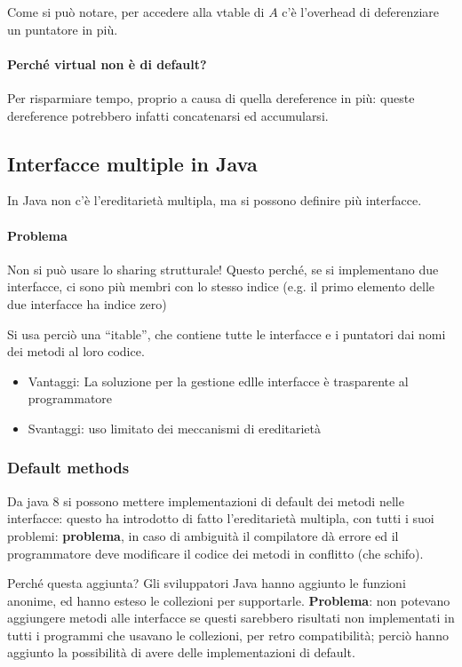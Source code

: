 \documentclass[a4paper,10pt]{article}
\begin{document}
Come si può notare, per accedere alla vtable di $A$ c'è l'overhead di deferenziare un puntatore in più.

\paragraph{Perché virtual non è di default?} Per risparmiare tempo, proprio a causa di quella dereference in più: queste dereference potrebbero infatti concatenarsi ed accumularsi.
\newpage

\subsection{Interfacce multiple in Java}

In Java non c'è l'ereditarietà multipla, ma si possono definire più interfacce. 

\paragraph{Problema} Non si può usare lo sharing strutturale! Questo perché, se si implementano due interfacce, ci sono più membri con lo stesso indice (e.g. il primo elemento delle due interfacce ha indice zero)\smallskip

Si usa perciò una ``itable'', che contiene tutte le interfacce e i puntatori dai nomi dei metodi al loro codice.\smallskip

\begin{itemize}
 \item Vantaggi: La soluzione per la gestione edlle interfacce è trasparente al programmatore 
 \item Svantaggi: uso limitato dei meccanismi di ereditarietà
\end{itemize}

\subsubsection{Default methods}

Da java 8 si possono mettere implementazioni di default dei metodi nelle interfacce: questo ha introdotto di fatto l'ereditarietà multipla, con tutti i suoi problemi: \textbf{problema}, in caso di ambiguità il compilatore dà errore ed il programmatore deve modificare il codice dei metodi in conflitto (che schifo).\smallskip

Perché questa aggiunta? Gli sviluppatori Java hanno aggiunto le funzioni anonime, ed hanno esteso le collezioni per supportarle. \textbf{Problema}: non potevano aggiungere metodi alle interfacce se questi sarebbero risultati non implementati in tutti i programmi che usavano le collezioni, per retro compatibilità; perciò hanno aggiunto la possibilità di avere delle implementazioni di default.
\end{document}
